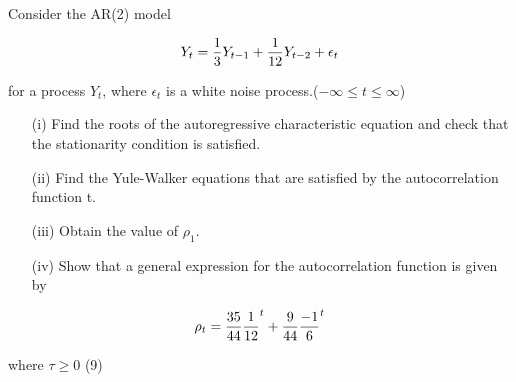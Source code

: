 \documentclass[12pt]{report}
\begin{document}





	
	Consider the AR(2) model
	
	
	\[Y_t={1\over 3}Y_{t-1}+{1\over 12}Y_{t-2}+ \epsilon_t\]
	
	for a process $Y_t$, where {$\epsilon_t$} is a white noise process.($-\infty \leq t \leq \infty$)
	
	\begin{itemize}
		\item[(i)] Find the roots of the autoregressive characteristic equation and check that the stationarity condition is satisfied.
		
		\item[(ii)] Find the Yule-Walker equations that are satisfied by the autocorrelation function t.
		
		\item[(iii)] Obtain the value of $\rho_1$.

		\item[(iv)] Show that a general expression for the autocorrelation function is given by
	\end{itemize}
	\[\rho_t={35\over 44}{1\over 12}^t +{9\over 44}{-1\over 6}^t
	\]
	
	where $\tau \geq 0$     (9)
\end{document}
